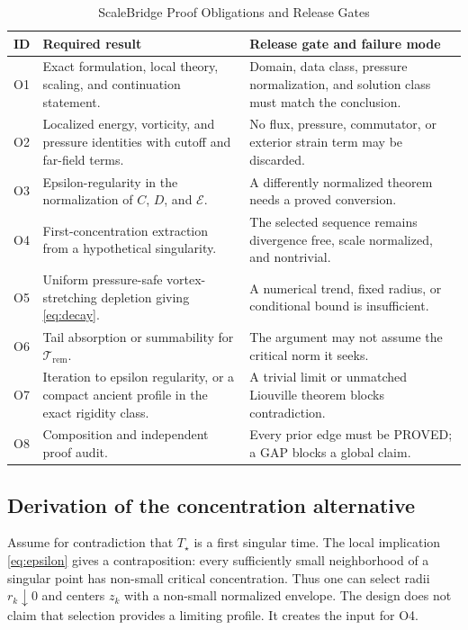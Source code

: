 \documentclass[conference]{../../../../Conference-LaTeX-template_10-17-19/IEEEtran}
\begin{document}
\begin{table}[t]
\caption{ScaleBridge Proof Obligations and Release Gates}
\centering\small
\begin{tabularx}{\textwidth}{p{}Y Y}
\toprule
ID & Required result & Release gate and failure mode\\
\midrule
O1 & Exact formulation, local theory, scaling, and continuation statement. & Domain, data class, pressure normalization, and solution class must match the conclusion.\\
O2 & Localized energy, vorticity, and pressure identities with cutoff and far-field terms. & No flux, pressure, commutator, or exterior strain term may be discarded.\\
O3 & Epsilon-regularity in the normalization of $C$, $D$, and $\mathcal E$. & A differently normalized theorem needs a proved conversion.\\
O4 & First-concentration extraction from a hypothetical singularity. & The selected sequence remains divergence free, scale normalized, and nontrivial.\\
O5 & Uniform pressure-safe vortex-stretching depletion giving \eqref{eq:decay}. & A numerical trend, fixed radius, or conditional bound is insufficient.\\
O6 & Tail absorption or summability for $\mathcal T_{\mathrm{rem}}$. & The argument may not assume the critical norm it seeks.\\
O7 & Iteration to epsilon regularity, or a compact ancient profile in the exact rigidity class. & A trivial limit or unmatched Liouville theorem blocks contradiction.\\
O8 & Composition and independent proof audit. & Every prior edge must be PROVED; a GAP blocks a global claim.\\
\bottomrule
\end{tabularx}
\end{table}

\subsection{Derivation of the concentration alternative}
Assume for contradiction that $T_\star$ is a first singular time. The local implication \eqref{eq:epsilon} gives a contraposition: every sufficiently small neighborhood of a singular point has non-small critical concentration. Thus one can select radii $r_k\downarrow0$ and centers $z_k$ with a non-small normalized envelope. The design does not claim that selection provides a limiting profile. It creates the input for O4.
\end{document}
